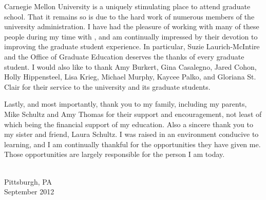 Carnegie Mellon University is a uniquely stimulating place to attend graduate school. That it remains so is due to the hard work of numerous members of the university administration. I have had the pleasure of working with many of these people during my time with , and am continually impressed by their devotion to improving the graduate student experience. In particular, Suzie Laurich-McIntire and the Office of Graduate Education deserves the thanks of every graduate student. I would also like to thank Amy Burkert, Gina Casalegno, Jared Cohon, Holly Hippensteel, Lisa Krieg, Michael Murphy, Kaycee Palko, and Gloriana St. Clair for their service to the university and its graduate students.

Lastly, and most importantly, thank you to my family, including my parents, Mike Schultz and Amy Thomas for their support and encouragement, not least of which being the financial support of my education. Also a sincere thank you to my sister and friend, Laura Schultz. I was raised in an environment conducive to learning, and I am continually thankful for the opportunities they have given me. Those opportunities are largely responsible for the person I am today.


{ \\ Pittsburgh, PA \\ September 2012\par}
